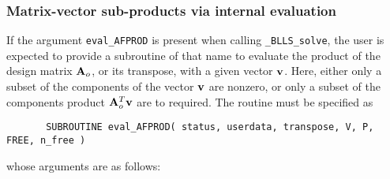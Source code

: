 \documentclass{galahad}
\newcommand{\packagename}{BLLS}
\newcommand{\fullpackagename}{\libraryname\_\packagename}
\newcommand{\solver}{{\tt \fullpackagename\_solve}}
\begin{document}

\subsubsection{Matrix-vector sub-products via internal evaluation\label{jvsp}}

If the argument {\tt eval\_AFPROD} is present when calling \solver, the
user is expected to provide a subroutine of that name to evaluate the
product of the design matrix ${\mathbf{A}}_o$, or its transpose, 
with a given vector ${\mathbf{v}}$.
Here, either only a subset of the components of the vector ${\mathbf{v}}$ are nonzero,
or only a subset of the components product ${\mathbf{A}}_o^T {\mathbf{v}}$ are to required.
The routine must be specified as

\def\baselinestretch{0.8}
{\tt \begin{verbatim}
       SUBROUTINE eval_AFPROD( status, userdata, transpose, V, P, FREE, n_free )
\end{verbatim} }
\def\baselinestretch{1.0}
\noindent whose arguments are as follows:
\end{document}
